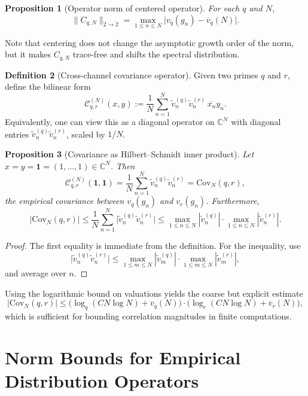 \documentclass[11pt]{article}
\theoremstyle{definition}
\newtheorem{definition}{Definition}[section]
\theoremstyle{plain}
\newtheorem{proposition}[definition]{Proposition}
\theoremstyle{remark}
\newcommand{\1}{\mathbb{1}}
\begin{document}
\begin{proposition}[Operator norm of centered operator]
For each \(q\) and \(N\),
\[
  \|C_{q,N}\|_{2\to 2} = \max_{1\le n\le N} \big|v_q(g_n) - \overline{v}_q(N)\big|.
\]
\end{proposition}

Note that centering does not change the asymptotic growth order of the norm, but it makes \(C_{q,N}\) trace-free and shifts the spectral distribution.

\begin{definition}[Cross-channel covariance operator]
Given two primes \(q\) and \(r\), define the bilinear form
\[
  \mathcal{C}_{q,r}^{(N)}(x,y) := \frac{1}{N}\sum_{n=1}^N \tilde{v}^{(q)}_n \tilde{v}^{(r)}_n \,\overline{x_n} y_n.
\]
Equivalently, one can view this as a diagonal operator on \(\mathbb{C}^N\) with diagonal entries \(\tilde{v}^{(q)}_n \tilde{v}^{(r)}_n\), scaled by \(1/N\).
\end{definition}

\begin{proposition}[Covariance as Hilbert–Schmidt inner product]
Let \(x = y = \mathbf{1} = (1,\dots,1)\in\mathbb{C}^N\). Then
\[
  \mathcal{C}_{q,r}^{(N)}(\mathbf{1},\mathbf{1}) = \frac{1}{N}\sum_{n=1}^N \tilde{v}^{(q)}_n \tilde{v}^{(r)}_n
  = \mathrm{Cov}_N(q,r),
\]
the empirical covariance between \(v_q(g_n)\) and \(v_r(g_n)\). Furthermore,
\[
  |\mathrm{Cov}_N(q,r)| \le \frac{1}{N}\sum_{n=1}^N \big|\tilde{v}^{(q)}_n \tilde{v}^{(r)}_n\big|
  \le \max_{1\le n\le N} |\tilde{v}^{(q)}_n| \cdot \max_{1\le n\le N} |\tilde{v}^{(r)}_n|.
\]
\end{proposition}

\begin{proof}
The first equality is immediate from the definition. For the inequality, use
\[
  \big|\tilde{v}^{(q)}_n \tilde{v}^{(r)}_n\big|
  \le \max_{1\le m\le N} |\tilde{v}^{(q)}_m| \cdot \max_{1\le m\le N} |\tilde{v}^{(r)}_m|,
\]
and average over \(n\).
\end{proof}

Using the logarithmic bound on valuations yields the coarse but explicit estimate
\[
  |\mathrm{Cov}_N(q,r)|
  \le \big(\log_q(C N\log N) + \overline{v}_q(N)\big)
     \cdot \big(\log_r(C N\log N) + \overline{v}_r(N)\big),
\]
which is sufficient for bounding correlation magnitudes in finite computations.

\section{Norm Bounds for Empirical Distribution Operators}
\end{document}
